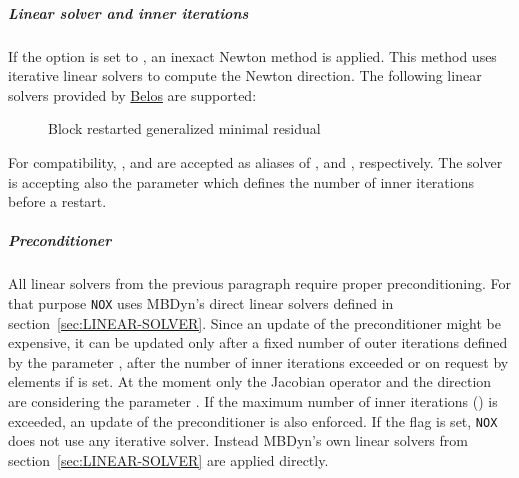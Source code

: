 \subparagraph{Linear solver and inner iterations}
If the option  is set to , an inexact Newton method is applied. This method uses iterative linear solvers to compute the Newton direction. The following linear solvers provided by \href{https://trilinos.github.io/belos.html}{Belos} are supported:
\begin{description}
\item[] Block restarted generalized minimal residual
\item[] 
\item[]
\item[]
\item[]
\item[] 
\item[] 
\item[] 
\item[] 
\item[] 
\item[] 
\item[] 
\item[] 
\item[] 
\item[] 
\end{description}
For compatibility, ,  and  are accepted
as aliases of , 
and , respectively.
The  solver is accepting also the parameter  which defines the number of inner iterations before a restart.
\subparagraph{Preconditioner}
All linear solvers from the previous paragraph require proper preconditioning. For that purpose \verb;NOX; uses MBDyn's direct linear solvers defined in section~\ref{sec:LINEAR-SOLVER}. Since an update of the preconditioner might be expensive, it can be updated only after a fixed number of outer iterations defined by the parameter , after the number of inner iterations exceeded  or on request by elements if  is set. At the moment only the  Jacobian operator and the  direction are considering the parameter . If the maximum number of inner iterations () is exceeded, an update of the preconditioner is also enforced. If the flag  is set, \verb;NOX; does not use any iterative solver. Instead MBDyn's own linear solvers from section~\ref{sec:LINEAR-SOLVER} are applied directly.
